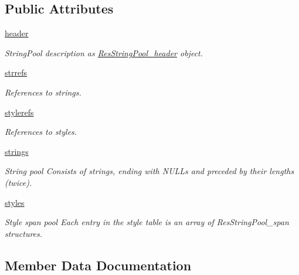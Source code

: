 \subsection*{Public Attributes}
\begin{DoxyCompactItemize}
\item 
\mbox{\label{classarsc_1_1stringpool_1_1ResStringPool_a8df057b196c2fbaf9a3a4eeeb3ff3357}} 
\mbox{\hyperlink{classarsc_1_1stringpool_1_1ResStringPool_a8df057b196c2fbaf9a3a4eeeb3ff3357}{header}}
\begin{DoxyCompactList}\small\item\em String\+Pool description as \mbox{\hyperlink{classarsc_1_1stringpool_1_1ResStringPool__header}{Res\+String\+Pool\+\_\+header}} object. \end{DoxyCompactList}\item 
\mbox{\hyperlink{classarsc_1_1stringpool_1_1ResStringPool_a3188382e081e43e85d549297ec499ac2}{strrefs}}
\begin{DoxyCompactList}\small\item\em References to strings. \end{DoxyCompactList}\item 
\mbox{\hyperlink{classarsc_1_1stringpool_1_1ResStringPool_a7264bcbbfd5862a58240c29e9f4655a1}{stylerefs}}
\begin{DoxyCompactList}\small\item\em References to styles. \end{DoxyCompactList}\item 
\mbox{\hyperlink{classarsc_1_1stringpool_1_1ResStringPool_a04ef90c01b1a31b1e32936e431a2166d}{strings}}
\begin{DoxyCompactList}\small\item\em String pool Consists of strings, ending with N\+U\+L\+Ls and preceded by their lengths (twice). \end{DoxyCompactList}\item 
\mbox{\hyperlink{classarsc_1_1stringpool_1_1ResStringPool_aa7ac2665b21f6bdd96bf4ed85f7d58ba}{styles}}
\begin{DoxyCompactList}\small\item\em Style span pool Each entry in the style table is an array of Res\+String\+Pool\+\_\+span structures. \end{DoxyCompactList}\end{DoxyCompactItemize}


\subsection{Member Data Documentation}
\mbox{\label{classarsc_1_1stringpool_1_1ResStringPool_a04ef90c01b1a31b1e32936e431a2166d}} 
